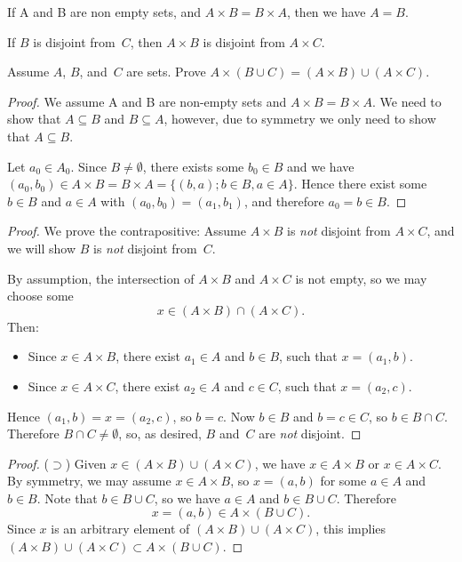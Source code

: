 \documentclass[../MATH-2000-Notes.tex]{subfiles}
\begin{document}
\begin{Questions}
    \item If A and B are non empty sets, and \(A \times B = B \times A\), then we have \(A = B\).
    \item \label{CartProdDisjoint} If $B$ is disjoint from~$C$, then $A \times B$ is disjoint from $A \times C$.
    \item \label{CartDistribUnionEg} Assume $A$, $B$, and~$C$ are sets. Prove $ A \times (B \cup C) = (A \times B) \cup (A \times C)$.
\end{Questions}
\begin{Answers}
    \item \begin{proof}
        We assume A and B are non-empty sets and \(A \times B = B \times A\). We need to show that \(A \subseteq B\) and \( B \subseteq A\), however, due to symmetry we only need to show that \(A \subseteq B\).

        Let \(a_0 \in A_0\). Since \(B \neq \emptyset\), there exists some \(b_0 \in B\) and we have \((a_0,b_0) \in A \times B = B \times A = \{(b,a); b\in B, a\in A\}\). Hence there exist some \(b \in B\) and \(a \in A\) with \((a_0,b_0) = (a_1,b_1)\), and therefore \(a_0 = b\in B\).
    \end{proof}
    \item  \begin{proof}
        We prove the contrapositive: Assume $A \times B$ is \emph{not} disjoint from $A \times C$, and we will show $B$ is \emph{not} disjoint from~$C$.

        By assumption, the intersection of $A \times B$ and $A \times C$ is not empty, so we may choose some
        $$x \in (A \times B) \cap (A \times C) .$$
        Then:
        \begin{itemize}
            \item Since $x \in A \times B$, there exist $a_1 \in A$ and $b \in B$, such that $x = (a_1,b)$.
            \item Since $x \in A \times C$, there exist $a_2 \in A$ and $c \in C$, such that $x = (a_2,c)$.
        \end{itemize}
        Hence $(a_1,b) = x = (a_2,c)$, so $b = c$.
        Now $b \in B$ and $b = c \in C$, so $b \in B \cap C$. Therefore $B \cap C \neq \emptyset$, so,
        as desired,
        $B$ and~$C$ are \emph{not} disjoint.
    \end{proof}
    \item \begin{proof}
        ($\supset$) Given $x \in (A \times B) \cup (A \times C)$, we have $x \in A \times B$ or $x \in A \times C$. By symmetry, we may assume $x \in A \times B$, so $x = (a,b)$ for some $a \in A$ and $b \in B$. Note that $b \in B \cup C$, so we have $a \in A$ and $b \in B \cup C$. Therefore
        $$ x = (a,b) \in A \times (B \cup C) .$$
        Since $x$ is an arbitrary element of $(A \times B) \cup (A \times C)$, this implies $ (A \times B) \cup (A \times C) \subset A \times (B \cup C)$.


\end{proof}
\end{Answers}
\end{document}
